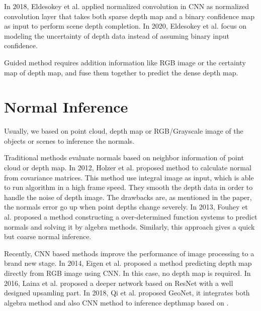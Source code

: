 In 2018, Eldesokey et al. \cite{ncnn} applied normalized convolution in CNN as normalized convolution layer that takes both sparse depth map and a binary confidence map as input to perform scene depth completion.
In 2020, Eldesokey et al. \cite{pncnn} focus on modeling the uncertainty of depth data instead of assuming binary input confidence.

Guided method \cite{guided} requires addition information like RGB image or the certainty map of depth map, and fuse them together to predict the dense depth map.




\section{Normal Inference}

Usually, we based on point cloud, depth map or RGB/Grayscale image of the objects or scenes to inference the normals. 

Traditional methods evaluate normals based on neighbor information of point cloud or depth map.
In 2012, Holzer et al. \cite{Holzer.S} proposed method to calculate normal from covariance matrices. 
This method use integral image as input, which is able to run algorithm in a high frame speed. They smooth the depth data in order to handle the noise of depth image. The drawbacks are, as mentioned in the paper, the normals error go up when point depths change severely. In 2013, Fouhey et al. \cite{geometry_based_solution} proposed a method constructing a over-determined function systems to predict normals and solving it 
by algebra methods. Similarly, this approach gives a quick but coarse normal inference. 


Recently, CNN based methods improve the performance of image processing to a brand new stage. In 2014, Eigen et al.\cite{Eigen} proposed a method predicting depth map directly from RGB image using CNN. In this case, no depth map is required. In 2016, Laina et al. \cite{img2depth} proposed a deeper network based on ResNet \cite{resnet} with a well designed upsamling part. 
In 2018, Qi et al. proposed GeoNet\cite{GeoNet}, it integrates both algebra method and also CNN method to inference depthmap based on \cite{img2depth} \cite{geometry_based_solution}. 

